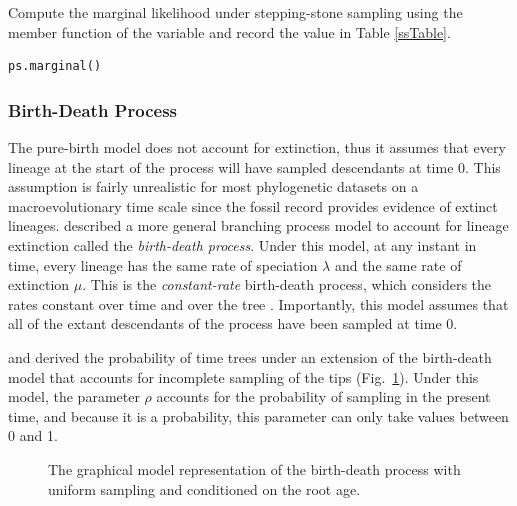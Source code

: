Compute the marginal likelihood under stepping-stone sampling using the member function  of the  variable and record the value in Table \ref{ssTable}.
{\tt \begin{snugshade*}
\begin{lstlisting}
ps.marginal() 
\end{lstlisting}
\end{snugshade*}}

\bigskip
\subsubsection{Birth-Death Process}\label{birthDeathSec}

The pure-birth model does not account for  extinction, thus it assumes that every lineage at the start of the process will have sampled descendants at time 0.
This assumption is fairly unrealistic for most phylogenetic datasets on a macroevolutionary time scale since the fossil record provides evidence of extinct lineages.
\citet{kendall48} described a more general branching process model to account for lineage extinction called the \textit{birth-death process}.
Under this model, at any instant in time, every lineage has the same rate of speciation $\lambda$ and the same rate of extinction $\mu$.
This is the \textit{constant-rate} birth-death process, which considers the rates constant over time and over the tree \citep{nee94}.
Importantly, this model assumes that all of the extant descendants of the process have been sampled at time 0.

\citet{yang97b} and \citet{stadler09} derived the probability of time trees under an extension of the birth-death model that accounts for incomplete sampling of the tips (Fig.~\ref{bdrGMFig1}). 
Under this model, the parameter $\rho$ accounts for the probability of sampling in the present time, and because it is a probability, this parameter can only take values between 0 and 1. 
\begin{figure}[h!]
\centering
{}
\caption{\small The graphical model representation of the birth-death process with uniform sampling and conditioned on the root age.}
\label{bdrGMFig1}
\end{figure}

